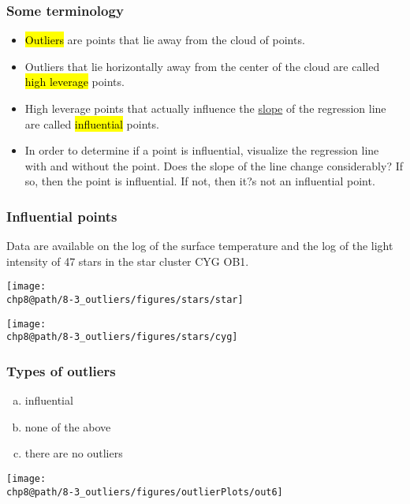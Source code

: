 \documentclass[slidestop,compress,mathserif]{beamer}
\makeatletter
\def\chp8@path{../../Chp 8}
\makeatother
\begin{document}

\begin{frame}
\frametitle{Some terminology}
 
\begin{itemize}

\item \hl{Outliers} are points that lie away from the cloud  of points.

\pause

\item Outliers that lie horizontally away from the center of the cloud are called \hl{high leverage} points.

\pause

\item High leverage points that actually influence the \underline{slope} of the regression line are called \hl{influential} points.

\pause

\item In order to determine if a point is influential, visualize the regression line with and without the point. Does the slope of the line change considerably? If so, then the point is influential. If not, then it?s not an influential point.

\end{itemize}

\end{frame}


\begin{frame}
\frametitle{Influential points}

Data are available on the log of the surface temperature and the log of the light intensity of 47 stars in the star cluster CYG OB1.

{
\begin{center}
\texttt{[image: \\chp8@path/8-3\_outliers/figures/stars/star]}
\end{center}
}
{
\begin{center}
\texttt{[image: \\chp8@path/8-3\_outliers/figures/stars/cyg]}
\end{center}
}

\end{frame}


\begin{frame}
\frametitle{Types of outliers}

{
\begin{enumerate}[(a)]
\item influential
\item none of the above
\item there are no outliers
\end{enumerate}
}
{
\begin{center}
\texttt{[image: \\chp8@path/8-3\_outliers/figures/outlierPlots/out6]}
\end{center}
}

\end{frame}
\end{document}
